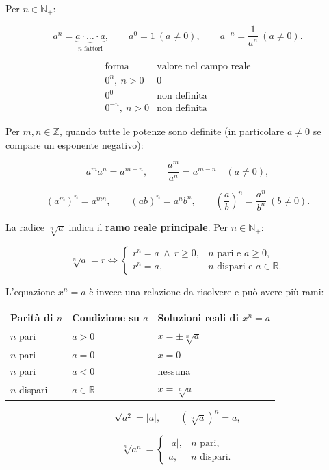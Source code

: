 Per \(n\in\mathbb N_+\):

\[
a^n=\underbrace{a\cdot\ldots\cdot a}_{n\text{ fattori}},
\qquad
a^0=1\ (a\ne0),
\qquad
a^{-n}=\frac1{a^n}\ (a\ne0).
\]

\[
\begin{array}{c|c}
\text{forma}&\text{valore nel campo reale}\\
\hline
0^n,\ n>0&0\\
0^0&\text{non definita}\\
0^{-n},\ n>0&\text{non definita}
\end{array}
\]

Per \(m,n\in\mathbb Z\), quando tutte le potenze sono definite (in particolare \(a\ne0\) se compare un esponente negativo):

\[
a^ma^n=a^{m+n},
\qquad
\frac{a^m}{a^n}=a^{m-n}\quad(a\ne0),
\]

\[
(a^m)^n=a^{mn},
\qquad
(ab)^n=a^nb^n,
\qquad
\left(\frac ab\right)^n=\frac{a^n}{b^n}\ (b\ne0).
\]

La radice \(\sqrt[n]{a}\) indica il \textbf{ramo reale principale}. Per \(n\in\mathbb N_+\):

\[
\sqrt[n]{a}=r
\Longleftrightarrow
\begin{cases}
r^n=a\ \land\ r\ge0,&n\text{ pari e }a\ge0,\\
r^n=a,&n\text{ dispari e }a\in\mathbb R.
\end{cases}
\]

L'equazione \(x^n=a\) è invece una relazione da risolvere e può avere più rami:

\begin{longtable}[]{@{}lll@{}}
\toprule\noalign{}
Parità di \(n\) & Condizione su \(a\) & Soluzioni reali di \(x^n=a\) \\
\midrule\noalign{}
\endhead
\bottomrule\noalign{}
\endlastfoot
\(n\) pari & \(a>0\) & \(x=\pm\sqrt[n]{a}\) \\
\(n\) pari & \(a=0\) & \(x=0\) \\
\(n\) pari & \(a<0\) & nessuna \\
\(n\) dispari & \(a\in\mathbb R\) & \(x=\sqrt[n]{a}\) \\
\end{longtable}

\[
\sqrt{a^2}=|a|,
\qquad
(\sqrt[n]{a})^n=a,
\]

\[
\sqrt[n]{a^n}=
\begin{cases}
|a|,&n\text{ pari},\\
a,&n\text{ dispari}.
\end{cases}
\]

